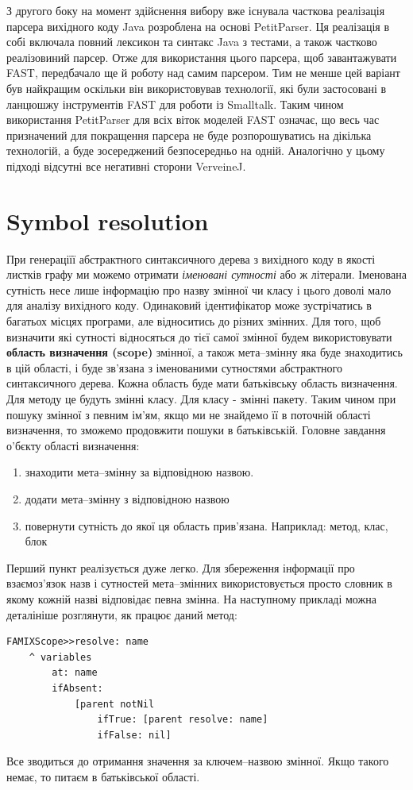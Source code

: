 \documentclass[12pt,a4paper]{article}
\begin{document}
З другого боку на момент здійснення вибору вже існувала часткова реалізація парсера вихідного коду Java розроблена на основі PetitParser. Ця реалізація в собі включала повний лексикон та синтакс Java з тестами, а також частково реалізовиний парсер. Отже для використання цього парсера, щоб завантажувати FAST, передбачало ще й роботу над самим парсером. Тим не менше цей варіант був найкращим оскільки він використовував технології, які були застосовані в ланцюшжу інструментів FAST для роботи із Smalltalk. Таким чином використання PetitParser для всіх віток моделей FAST означає, що весь час призначений для покращення парсера не буде розпорошуватись на дікілька технологій, а буде зосереджений безпосередньо на одній. Аналогічно у цьому підході відсутні все негативні сторони VerveineJ.

\clearpage

\section{Symbol resolution}
При генераціїї абстрактного синтаксичного дерева з вихідного коду в якості листків графу ми можемо отримати \emph{іменовані сутності} або ж літерали. Іменована сутність несе лише інформацію про назву змінної чи класу і цього доволі мало для аналізу вихідного коду. Одинаковий ідентифікатор може зустрічатись в багатьох місцях програми, але відноситись до різних змінних. Для того, щоб визначити які сутності відносяться до тієї самої змінної будем використовувати \textbf{область визначення (scope)} змінної, а також мета--змінну яка буде знаходитись в цій області, і буде зв'язана з іменованими сутностями абстрактного синтаксичного дерева. Кожна область буде мати батьківську область визначення. Для методу це будуть змінні класу. Для класу - змінні пакету. Таким чином при пошуку змінної з певним ім'ям, якщо ми не знайдемо її в поточній області визначення, то зможемо продовжити пошуки в батьківській. Головне завдання о'бєкту області визначення:
\begin{enumerate}
\item знаходити мета--змінну за відповідною назвою.
\item додати мета--змінну з відповідною назвою
\item повернути сутність до якої ця область прив'язана. Наприклад: метод, клас, блок
\end{enumerate}

Перший пункт реалізується дуже легко. Для збереження інформації про взаємоз'язок назв і сутностей мета--змінних використовується просто словник в якому кожній назві відповідає певна змінна. На наступному прикладі можна деталініше розглянути, як працює даний метод:
\begin{lstlisting}[language=Smalltalk]
FAMIXScope>>resolve: name
	^ variables
		at: name
		ifAbsent: 
			[parent notNil 
				ifTrue: [parent resolve: name] 
				ifFalse: nil]
\end{lstlisting}
Все зводиться до отримання значення за ключем--назвою змінної. Якщо такого немає, то питаєм в батьківської області.
\end{document}
